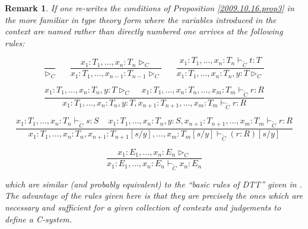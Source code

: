 \documentclass[11pt]{article}
\newtheorem{remark}[proposition]{Remark}
\newcommand{\llabel}[1]{\label{#1}}
\newcommand{\wt}{\widetilde}
\begin{document}
\begin{remark}\rm\llabel{2010.08.07.rem1} If one re-writes the conditions of Proposition \ref{2009.10.16.prop3} in the more familiar in type theory form where the variables introduced in the context are named rather than directly numbered one arrives at the following rules:

\begin{center}

$$\frac{}{\rhd_{C}}\,\,\,\,\,\,\,\,\,\,
\frac{x_1:T_1,\dots,x_n:T_n\rhd_{C}}{x_1:T_1,\dots,x_{n-1}:T_{n-1}\rhd_{C}} \,\,\,\,\,\,\,\,\,\, 
\frac{x_1:T_1,\dots,x_n:T_n\vdash_{\wt{C}} t:T}{x_1:T_1,\dots,x_n:T_n, y:T\rhd_{C}}$$

$$\frac{x_1:T_1,\dots,x_n:T_n, y:T\rhd_{C}\,\,\,\,\,\,\,x_1:T_1,\dots,x_n:T_n,\dots, x_m:T_m\vdash_{\wt{C}} r:R}{x_1:T_1,\dots,x_n:T_n, y:T, x_{n+1}:T_{n+1},\dots,x_m:T_m\vdash_{\wt{C}} r:R}$$

$$\frac{x_1:T_1,\dots,x_n:T_n\vdash_{\wt{C}} s:S\,\,\,\,\,\,\,x_1:T_1,\dots,x_n:T_n,y:S,x_{n+1}:T_{n+1},\dots,x_m:T_m\vdash_{\wt{C}} r:R}
{x_1:T_1,\dots,x_n:T_n,x_{n+1}:T_{n+1}[s/y],\dots,x_m:T_m[s/y]\vdash_{\wt{C}} (r:R)[s/y]}$$

$$\frac{x_1:E_1,\dots,x_n:E_n\rhd_{C}}{x_1:E_1,\dots,x_n:E_n\vdash_{\wt{C}} x_n:E_n}$$

\end{center}
%
which are similar (and probably equivalent) to the ``basic rules of DTT'' given in \cite[p.585]{Jacobs1}. The advantage of the rules given here is that they are precisely the ones which are necessary and sufficient for a given collection of contexts and judgements to define a C-system.

\end{remark}
\end{document}
